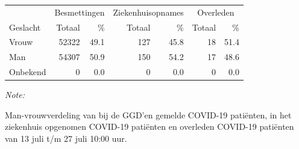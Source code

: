 \documentclass[
  english,
  man,floatsintext]{apa6}
\begin{document}
\begin{table}
\centering\begingroup\fontsize{11}{13}\selectfont

\begin{threeparttable}
\begin{tabular}{lrrrrrr}
\toprule
\multicolumn{1}{c}{ } & \multicolumn{2}{c}{Besmettingen} & \multicolumn{2}{c}{Ziekenhuisopnames} & \multicolumn{2}{c}{Overleden} \\
\cmidrule(l{3pt}r{3pt}){2-3} \cmidrule(l{3pt}r{3pt}){4-5} \cmidrule(l{3pt}r{3pt}){6-7}
Geslacht & Totaal & \% & Totaal & \% & Totaal & \%\\
\midrule
Vrouw & 52322 & 49.1 & 127 & 45.8 & 18 & 51.4\\
Man & 54307 & 50.9 & 150 & 54.2 & 17 & 48.6\\
Onbekend & 0 & 0.0 & 0 & 0.0 & 0 & 0.0\\
\bottomrule
\end{tabular}
\begin{tablenotes}
\item \textit{Note: } 
\item Man-vrouwverdeling van bij de GGD’en gemelde COVID-19 patiënten, in het ziekenhuis opgenomen COVID-19 patiënten en overleden COVID-19 patiënten van 13 juli t/m 27 juli 10:00 uur.
\end{tablenotes}
\end{threeparttable}
\endgroup{}
\end{table}
\newpage
\end{document}
